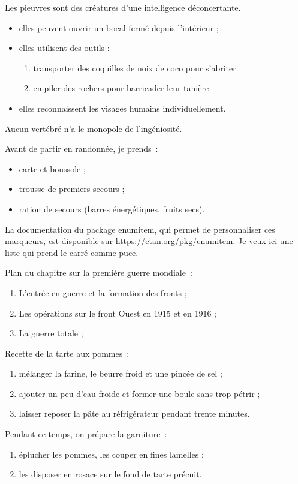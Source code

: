 \documentclass{article}
\begin{document}
Les pieuvres sont des créatures d'une intelligence déconcertante.
\begin{itemize}
\item elles peuvent ouvrir un bocal fermé depuis l'intérieur ;
\item elles utilisent des outils :
	\begin{enumerate}
	\item transporter des coquilles de noix de coco pour s'abriter
	\item empiler des rochers pour barricader leur tanière
	\end{enumerate}
\item elles reconnaissent les visages humains individuellement.
\end{itemize}
Aucun vertébré n'a le monopole de l'ingéniosité.

Avant de partir en randonnée, je prends~:
\begin{itemize}[label=$\square$]
\item carte et boussole ;
\item trousse de premiers secours ;
\item ration de secours (barres énergétiques, fruits secs).
\end{itemize}
La documentation du package enumitem, qui permet de
personnaliser ces marqueurs, est disponible sur
\url{https://ctan.org/pkg/enumitem}. Je veux ici une liste qui prend le carré comme puce.

Plan du chapitre sur la première guerre mondiale~:
\begin{enumerate}[label=\Alph*)]
\item L’entrée en guerre et la formation des fronts ;
\item Les opérations sur le front Ouest en 1915 et en 1916 ;
\item La guerre totale ;
\end{enumerate}

Recette de la tarte aux pommes~:
\begin{enumerate}[label=\arabic*)]
\item mélanger la farine, le beurre froid et une pincée de sel ;
\item ajouter un peu d'eau froide et former une boule sans trop pétrir ;
\item laisser reposer la pâte au réfrigérateur pendant trente minutes.
\end{enumerate}
Pendant ce temps, on prépare la garniture~:
\begin{enumerate}[label=\arabic*),resume]
\item éplucher les pommes, les couper en fines lamelles ;
\item les disposer en rosace sur le fond de tarte précuit.
\end{enumerate}
\end{document}

